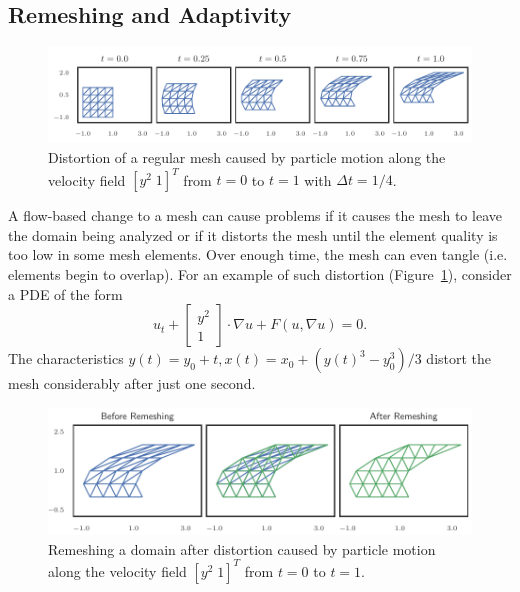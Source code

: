 \subsection{Remeshing and Adaptivity}

\begin{figure}
  \includegraphics{../images/solution-transfer/mesh_distortion.pdf}
  \centering
  \captionsetup{width=.75\linewidth}
  \caption{Distortion of a regular mesh caused by particle motion along
    the velocity field \(\left[ y^2 \; 1 \right]^T\) from \(t = 0\)
    to \(t = 1\) with \(\Delta t = 1/4\).}
  \label{fig:mesh-distortion}
\end{figure}

A flow-based change to a mesh can cause problems if it causes the mesh to
leave the domain being analyzed or if it distorts the mesh until the element
quality is too low in some mesh elements. Over enough time, the mesh can
even tangle (i.e. elements begin to overlap).
For an example of such distortion (Figure~\ref{fig:mesh-distortion}),
consider a PDE of the form
\begin{equation}\label{eq:non-rigid-characteristics}
u_t + \left[ \begin{array}{c} y^2 \\ 1 \end{array}\right] \cdot \nabla u +
  F\left(u, \nabla u\right) = 0.
\end{equation}
The characteristics \(y(t) = y_0 + t, x(t) = x_0 +
\left(y(t)^3 - y_0^3\right)/3\)
distort the mesh considerably after just one second.

\begin{figure}
  \includegraphics{../images/solution-transfer/distortion_remesh.pdf}
  \centering
  \captionsetup{width=.75\linewidth}
  \caption{Remeshing a domain after distortion caused by particle motion
    along the velocity field \(\left[ y^2 \; 1 \right]^T\) from \(t = 0\)
    to \(t = 1\).}
  \label{fig:distortion-remesh}
\end{figure}

